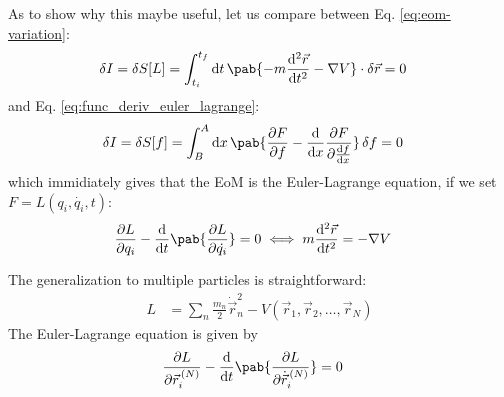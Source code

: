 As to show why this maybe useful, let us compare between Eq. \eqref{eq:eom-variation}:
\begin{align}
  \fdif{I} = \fdif{S}[L] & = \int_{t_i}^{t_f} \odif{t} \, \pab{- m \odv[2]{\vec{r}}{t} - \nabla V} \cdot \fdif{\vec{r}} = 0
\end{align}
and Eq. \eqref{eq:func_deriv_euler_lagrange}:
\begin{align}
  \fdif{I} = \fdif{S}[f] & = \int_B^A \odif{x} \, \pab{\pdv{F}{f} - \odv{}{x} \pdv{F}{\odv{f}{x}}} \fdif{f} = 0
\end{align}
which immidiately gives that the EoM is the Euler-Lagrange equation, if we set $F = L(q_i, \dot{q_i}, t)$:
\begin{align}
  \pdv{L}{q_i} - \odv{}{t} \pab{\pdv{L}{\dot{q_i}}} & = 0 \iff m \odv[2]{\vec{r}}{t} = - \nabla V
\end{align}

The generalization to multiple particles is straightforward:
\begin{align}
  L & = \sum_{n} \frac{m_n}{2} \dot{\vec{r}}_n^2 - V(\vec{r}_1, \vec{r}_2, \ldots, \vec{r}_N)
\end{align}
The Euler-Lagrange equation is given by
\begin{align}
  \pdv{L}{\vec{r}_i^{\, (N)}} - \odv{}{t} \pab{\pdv{L}{\dot{\vec{r}}_i^{\, (N)}}} & = 0
\end{align}

